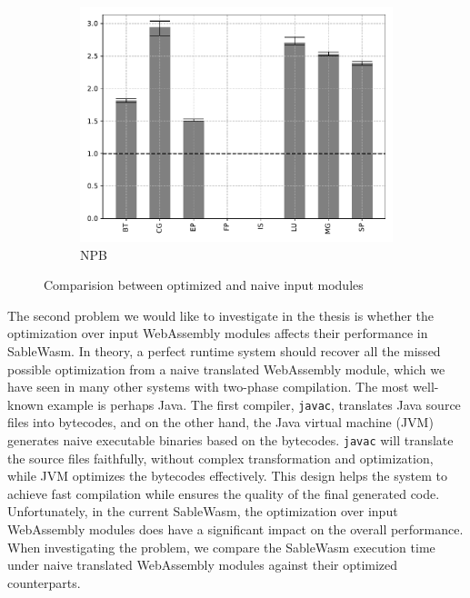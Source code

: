 \begin{figure}
\begin{subfigure}[t]{.45\textwidth}
        \includegraphics[width=\textwidth]{Images/6.2.RQ2/npb-opt-speedup}
        \caption{NPB}
    \end{subfigure}
    \caption{Comparision between optimized and naive input modules}
    \label{fig:rq2}
\end{figure}

The second problem we would like to investigate in the thesis is whether the optimization over input WebAssembly modules affects their performance in SableWasm. In theory, a perfect runtime system should recover all the missed possible optimization from a naive translated WebAssembly module, which we have seen in many other systems with two-phase compilation. The most well-known example is perhaps Java. The first compiler, \texttt{javac}, translates Java source files into bytecodes, and on the other hand, the Java virtual machine (JVM) generates naive executable binaries based on the bytecodes. \texttt{javac} will translate the source files faithfully, without complex transformation and optimization, while JVM optimizes the bytecodes effectively.  This design helps the system to achieve fast compilation while ensures the quality of the final generated code. Unfortunately, in the current SableWasm, the optimization over input WebAssembly modules does have a significant impact on the overall performance. When investigating the problem, we compare the SableWasm execution time under naive translated WebAssembly modules against their optimized counterparts.

